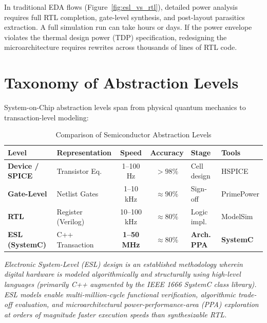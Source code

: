 \documentclass[11pt,a4paper,oneside]{report}
\begin{document}
In traditional EDA flows (Figure~\ref{fig:esl_vs_rtl}), detailed power analysis requires full RTL completion, gate-level synthesis, and post-layout parasitics extraction. A full simulation run can take hours or days. If the power envelope violates the thermal design power (TDP) specification, redesigning the microarchitecture requires rewrites across thousands of lines of RTL code.

\section{Taxonomy of Abstraction Levels}
System-on-Chip abstraction levels span from physical quantum mechanics to transaction-level modeling:

\begin{table}[h!]
\centering
\caption{Comparison of Semiconductor Abstraction Levels}
\label{tab:abstraction_levels}
\begin{tabularx}{\textwidth}{l X c c p{2.8cm} p{2.2cm}}
\toprule
\textbf{Level} & \textbf{Representation} & \textbf{Speed} & \textbf{Accuracy} & \textbf{Stage} & \textbf{Tools} \\
\midrule
\textbf{Device / SPICE} & Transistor Eq. & 1--100 Hz & $>98\%$ & Cell design & HSPICE \\
\textbf{Gate-Level} & Netlist Gates & 1--10 kHz & $\approx 90\%$ & Sign-off & PrimePower \\
\textbf{RTL} & Register (Verilog) & 10--100 kHz & $\approx 80\%$ & Logic impl. & ModelSim \\
\textbf{ESL (SystemC)} & C++ Transaction & \textbf{1--50 MHz} & \textbf{$\approx 80\%$} & \textbf{Arch. PPA} & \textbf{SystemC} \\
\bottomrule
\end{tabularx}
\end{table}

\begin{definitionbox}
\textit{Electronic System-Level (ESL) design is an established methodology wherein digital hardware is modeled algorithmically and structurally using high-level languages (primarily C++ augmented by the IEEE 1666 SystemC class library). ESL models enable multi-million-cycle functional verification, algorithmic trade-off evaluation, and microarchitectural power-performance-area (PPA) exploration at orders of magnitude faster execution speeds than synthesizable RTL.}
\end{definitionbox}
\end{document}
